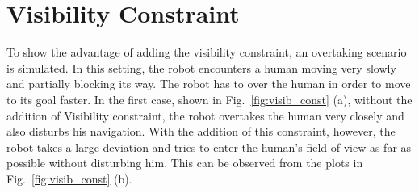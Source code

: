 \section{Visibility Constraint}
\hspace{\parindent} To show the advantage of adding the visibility constraint, an overtaking scenario is simulated. In this setting, the robot encounters a human moving very slowly and partially blocking its way. The robot has to over the human in order to move to its goal faster. In the first case, shown in Fig.~\ref{fig:visib_const} (a), without the addition of Visibility constraint, the robot overtakes the human very closely and also disturbs his navigation. With the addition of this constraint, however, the robot takes a large deviation and tries to enter the human's field of view as far as possible without disturbing him. This can be observed from the plots in Fig.~\ref{fig:visib_const} (b).
